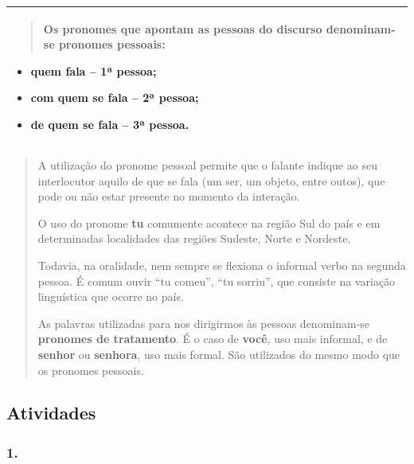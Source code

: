 \begin{longtable}[]{@{}l@{}}
\toprule
\begin{minipage}[t]{0.97\columnwidth}\raggedright\strut
\begin{quote}
Os pronomes que apontam as pessoas do discurso denominam-se
\textbf{pronomes pessoais}:
\end{quote}

\begin{itemize}
\item
  quem fala -- 1ª pessoa;
\item
  com quem se fala -- 2ª pessoa;
\item
  de quem se fala -- 3ª pessoa.
\end{itemize}\strut
\end{minipage}\tabularnewline
\bottomrule
\end{longtable}

\begin{quote}
A utilização do pronome pessoal permite que o falante indique ao seu
interlocutor aquilo de que se fala (um ser, um objeto, entre outos), que
pode ou não estar presente no momento da interação.

O uso do pronome \textbf{tu} comumente acontece na região Sul do país e
em determinadas localidades das regiões Sudeste, Norte e Nordeste.

Todavia, na oralidade, nem sempre se flexiona o informal verbo na
segunda pessoa. É comum ouvir ``tu comeu'', ``tu sorriu'', que consiste
na variação linguística que ocorre no país.

As palavras utilizadas para nos dirigirmos às pessoas denominam-se
\textbf{pronomes de tratamento}. É o caso de \textbf{você}, uso mais
informal, e de \textbf{senhor} ou \textbf{senhora}, uso mais formal. São
utilizados do mesmo modo que os pronomes pessoais.
\end{quote}

\subsection{Atividades}\label{atividades-9}

\subsubsection{1. }\label{section-71}


